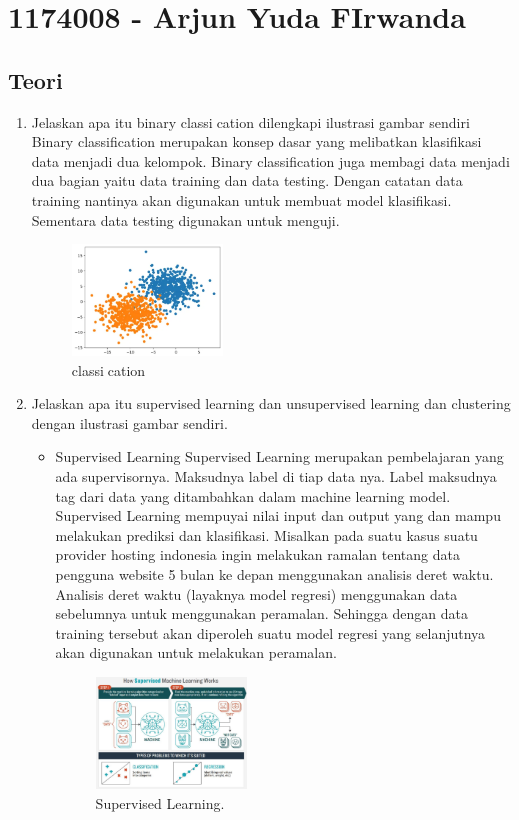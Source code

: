 \section{1174008 - Arjun Yuda FIrwanda}
\subsection{Teori}
\begin{enumerate}
	\item Jelaskan apa itu binary classication dilengkapi ilustrasi gambar sendiri
	\hfill\break
	Binary classification merupakan konsep dasar yang melibatkan klasifikasi data menjadi dua kelompok. Binary classification juga membagi data menjadi dua bagian yaitu data training dan data  testing. Dengan catatan data training nantinya akan digunakan untuk membuat model klasifikasi. Sementara data testing digunakan untuk menguji.
	\begin{figure}[H]
		\includegraphics[width=4cm]{figures/1174008/2/binary.PNG}
		\centering
		\caption{classication}
	\end{figure}

	\item Jelaskan apa itu supervised learning dan unsupervised learning dan clustering dengan ilustrasi gambar sendiri.
	\hfill\break


	\begin{itemize}
		\item Supervised Learning
		\hfill\break
		Supervised Learning merupakan pembelajaran yang ada supervisornya. Maksudnya label di tiap data nya. Label maksudnya tag dari data yang ditambahkan dalam machine learning model. Supervised Learning mempuyai nilai input dan output yang dan mampu melakukan prediksi dan klasifikasi. Misalkan pada suatu kasus suatu provider hosting indonesia ingin melakukan ramalan tentang data pengguna website 5 bulan ke depan menggunakan analisis deret waktu. Analisis deret waktu (layaknya model regresi) menggunakan data sebelumnya untuk menggunakan peramalan. Sehingga dengan data training tersebut akan diperoleh suatu model regresi yang selanjutnya akan digunakan untuk melakukan peramalan.
		\begin{figure}[H]
		\centering
			\includegraphics[width=4cm]{figures/1174008/2/supervisedlearning.PNG}
			\caption{Supervised Learning.}
		\end{figure}


\end{itemize}
\end{enumerate}
